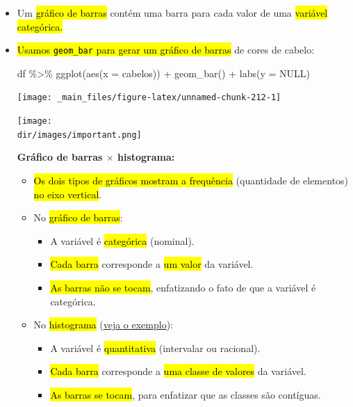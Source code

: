 \documentclass[
  11pt]{report}
\newenvironment{Shaded}{\begin{snugshade}}{\end{snugshade}}
\newcommand{\AttributeTok}[1]{\textcolor[rgb]{0.77,0.63,0.00}{#1}}
\newcommand{\ConstantTok}[1]{\textcolor[rgb]{0.00,0.00,0.00}{#1}}
\newcommand{\FunctionTok}[1]{\textcolor[rgb]{0.00,0.00,0.00}{#1}}
\newcommand{\NormalTok}[1]{#1}
\newcommand{\SpecialCharTok}[1]{\textcolor[rgb]{0.00,0.00,0.00}{#1}}
\newcommand{\dir}{/ssd/R/x86_64-pc-linux-gnu-library/4.2/fnaufelRmd/rmarkdown/resources}
\newenvironment{rmdimportant}
{
  \begin{myimportant}
    \texttt{[image: \\dir/images/important.png]}
    \tcblower
  }
  {
  \end{myimportant}
}
\renewenvironment{Shaded}{
    \begin{mdframed}[%
      roundcorner=2pt,%
      innerleftmargin=5pt,%
      innerrightmargin=5pt,%
      topline=true,%
      leftline=true,%
      rightline=true,%
      bottomline=true,%
      linewidth=0.5pt,%
      linecolor=black!20,%
      backgroundcolor=black!2,%
      skipabove=2ex,%
      skipbelow=2.5ex%
    ]%
  }
  {
    \end{mdframed}
  }
\begin{document}
\begin{itemize}
\item
  Um {\hl{gráfico de barras}} contém uma barra para cada valor de uma {\hl{variável categórica.}}
\item
  {\hl{Usamos {\mbox{\texttt{geom\_bar}}} para gerar um gráfico de barras}} de cores de cabelo:

\begin{Shaded}
\begin{Highlighting}[]
\NormalTok{df }\SpecialCharTok{\%\textgreater{}\%} 
  \FunctionTok{ggplot}\NormalTok{(}\FunctionTok{aes}\NormalTok{(}\AttributeTok{x =}\NormalTok{ cabelos)) }\SpecialCharTok{+}
    \FunctionTok{geom\_bar}\NormalTok{() }\SpecialCharTok{+}
    \FunctionTok{labs}\NormalTok{(}\AttributeTok{y =} \ConstantTok{NULL}\NormalTok{)}
\end{Highlighting}
\end{Shaded}

  \begin{center}\texttt{[image: \_main\_files/figure-latex/unnamed-chunk-212-1]} \end{center}

  \begin{rmdimportant}

  \textbf{Gráfico de barras $\times$ histograma:}

  \begin{itemize}
  \item
    {\hl{Os dois tipos de gráficos mostram a frequência}} (quantidade de elementos) {\hl{no eixo vertical}}.
  \item
    No {\hl{gráfico de barras}}:

    \begin{itemize}
    \item
      A variável é {\hl{categórica}} (nominal).
    \item
      {\hl{Cada barra}} corresponde a {\hl{um valor}} da variável.
    \item
      {\hl{As barras não se tocam}}, enfatizando o fato de que a variável é categórica.
    \end{itemize}
  \item
    No {\hl{histograma}} (\protect\hyperlink{histograma1}{veja o exemplo}):

    \begin{itemize}
    \item
      A variável é {\hl{quantitativa}} (intervalar ou racional).
    \item
      {\hl{Cada barra}} corresponde a {\hl{uma classe de valores}} da variável.
    \item
      {\hl{As barras se tocam}}, para enfatizar que as classes são contíguas.
    \end{itemize}
  \end{itemize}


\end{rmdimportant}
\end{itemize}
\end{document}
